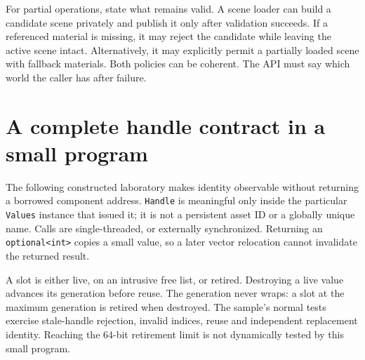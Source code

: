 For partial operations, state what remains valid. A scene loader can build a candidate scene privately and publish it only after validation succeeds. If a referenced material is missing, it may reject the candidate while leaving the active scene intact. Alternatively, it may explicitly permit a partially loaded scene with fallback materials. Both policies can be coherent. The API must say which world the caller has after failure.

\section{A complete handle contract in a small program}\label{05-engine-i-ch008-a-complete-handle-contract-in-a-small-program}

The following constructed laboratory makes identity observable without returning a borrowed component address. \texttt{Handle} is meaningful only inside the particular \texttt{Values} instance that issued it; it is not a persistent asset ID or a globally unique name. Calls are single-threaded, or externally synchronized. Returning an \texttt{optional\textless{}int\textgreater{}} copies a small value, so a later vector relocation cannot invalidate the returned result.

A slot is either live, on an intrusive free list, or retired. Destroying a live value advances its generation before reuse. The generation never wraps: a slot at the maximum generation is retired when destroyed. The sample's normal tests exercise stale-handle rejection, invalid indices, reuse and independent replacement identity. Reaching the 64-bit retirement limit is not dynamically tested by this small program.

